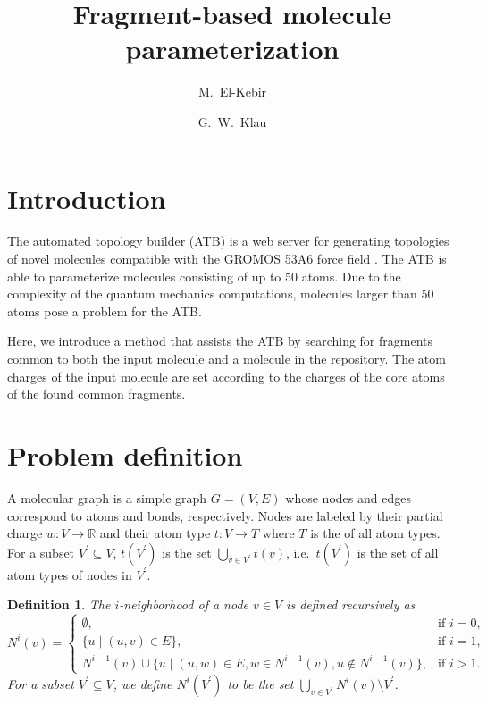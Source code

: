 \documentclass[11pt]{article}
\author{M.~El-Kebir \and  G.~W.~Klau}
\title{Fragment-based molecule parameterization}
\newtheorem{definition}{Definition}[section]
\begin{document}
\maketitle

\section{Introduction}

The automated topology builder (ATB) is a web server for generating topologies
of novel molecules compatible with the GROMOS 53A6 force field \cite{Malde11}.
The ATB is able to parameterize molecules consisting of up to 50 atoms. Due to
the complexity of the quantum mechanics computations, molecules larger than 50
atoms pose a problem for the ATB.

Here, we introduce a method that assists the ATB by searching for fragments
common to both the input molecule and a molecule in the repository. The atom
charges of the input molecule are set according to the charges of the core atoms
of the found common fragments.

\section{Problem definition}

A molecular graph is a simple graph $G=(V,E)$ whose nodes and edges correspond
to atoms and bonds, respectively. Nodes are labeled by their partial charge $w :
V \rightarrow \mathbb{R}$ and their atom type $t : V \rightarrow T$ where $T$ is
the of all atom types. For a subset $V^\prime \subseteq V$, $t(V^\prime)$ is the
set $\bigcup_{v \in V^\prime} t(v)$, i.e.\ $t(V^\prime)$ is the set of all atom
types of nodes in $V^\prime$.

\begin{definition}
  The \emph{$i$-neighborhood} of a node $v \in V$ is defined recursively as
  \[
    N^i(v) = 
  \begin{cases}
    \emptyset, & \mbox{if $i=0$,}\\
    \{ u \mid (u,v) \in E \}, & \mbox{if $i=1$,}\\
    N^{i-1}(v) \cup \{ u \mid (u,w) \in E, w \in N^{i-1}(v), u \not \in
    N^{i-1}(v) \}, & \mbox{if $i > 1$.}
  \end{cases}
  \]
  For a subset $V^\prime \subseteq V$, we define $N^i(V^\prime)$ to
  be the set $\bigcup_{v \in V^\prime} N^i(v) \setminus V^\prime$.
\end{definition}
\end{document}
